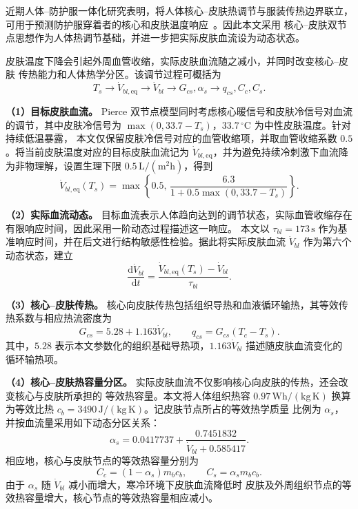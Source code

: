 \documentclass[withoutpreface,bwprint]{cumcmthesis}
\begin{document}
近期人体--防护服一体化研究表明，将人体核心--皮肤热调节与服装传热边界联立，
可用于预测防护服穿着者的核心和皮肤温度响应~\cite{zheng2024integrated}。因此本文采用
核心--皮肤双节点思想作为人体热调节基础，并进一步把实际皮肤血流设为动态状态。

皮肤温度下降会引起外周血管收缩，实际皮肤血流随之减小，并同时改变核心--皮肤
传热能力和人体热学分区。该调节过程可概括为
\[
T_s\longrightarrow \dot V_{bl,\mathrm{eq}}
\longrightarrow \dot V_{bl}
\longrightarrow G_{cs},\alpha_s
\longrightarrow q_{cs},C_c,C_s.
\]

\textbf{（1）目标皮肤血流。}
Pierce 双节点模型同时考虑核心暖信号和皮肤冷信号对血流的调节，其中皮肤冷信号为
$\max(0,33.7-T_s)$，$33.7\,^{\circ}\mathrm C$ 为中性皮肤温度。针对持续低温暴露，
本文仅保留皮肤冷信号对应的血管收缩项，并取血管收缩系数
$0.5$。将当前皮肤温度对应的目标皮肤血流记为
$\dot V_{bl,\mathrm{eq}}$，并为避免持续冷刺激下血流降为非物理解，设置生理下限
$0.5\,\mathrm{L/(m^2h)}$，得到
\begin{equation}
\dot V_{bl,\mathrm{eq}}(T_s)
=\max\!\left\{
0.5,\,
\frac{6.3}{1+0.5\max(0,33.7-T_s)}
\right\}.
\label{eq:q1-blood-flow-equilibrium}
\end{equation}

\textbf{（2）实际血流动态。}
目标血流表示人体趋向达到的调节状态，实际血管收缩存在有限响应时间，因此采用一阶动态过程描述这一响应。
本文以 $\tau_{bl}=173\,\mathrm s$ 作为基准响应时间，并在后文进行结构敏感性检验。据此将实际皮肤血流
$\dot V_{bl}$ 作为第六个动态状态，建立
\begin{equation}
\frac{\mathrm d\dot V_{bl}}{\mathrm dt}
=\frac{\dot V_{bl,\mathrm{eq}}(T_s)-\dot V_{bl}}{\tau_{bl}}.
\label{eq:q1-blood-flow-dynamics}
\end{equation}


\textbf{（3）核心--皮肤传热。}
核心向皮肤传热包括组织导热和血液循环输热，其等效传热系数与相应热流密度为
\begin{equation}
G_{cs}=5.28+1.163\dot V_{bl},\qquad
q_{cs}=G_{cs}(T_c-T_s).
\label{eq:q1-core-skin-heat-transfer}
\end{equation}
其中，$5.28$ 表示本文参数化的组织基础导热项，$1.163\dot V_{bl}$ 描述随皮肤血流变化的
循环输热项。

\textbf{（4）核心--皮肤热容量分区。}
实际皮肤血流不仅影响核心向皮肤的传热，还会改变核心与皮肤所承担的
等效热容量。本文将人体组织热容 $0.97\,\mathrm{Wh/(kg\,K)}$ 换算为等效比热
$c_b=3490\,\mathrm{J/(kg\,K)}$。记皮肤节点所占的等效热学质量
比例为 $\alpha_s$，并按血流量采用如下动态分区关系：
\begin{equation}
\alpha_s=0.0417737+
\frac{0.7451832}{\dot V_{bl}+0.585417}.
\label{eq:q1-thermal-partition}
\end{equation}
相应地，核心与皮肤节点的等效热容量分别为
\[
C_c=(1-\alpha_s)m_bc_b,\qquad
C_s=\alpha_sm_bc_b.
\]
由于 $\alpha_s$ 随 $\dot V_{bl}$ 减小而增大，寒冷环境下皮肤血流降低时
皮肤及外周组织节点的等效热容量增大，核心节点的等效热容量相应减小。
\end{document}
